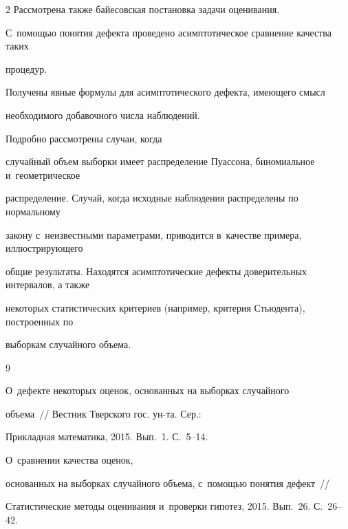 \begin{multicols}{2}
Рассмотрена также байесовская постановка задачи оценивания. 


С~по\-мощью понятия дефекта проведено асимптотическое сравнение качества таких 


процедур. 





Получены явные формулы для асимптотического дефекта, имеющего смысл


необходимого добавочного числа наблюдений. 





Подроб\-но рассмотрены случаи, когда 


случайный объем выборки имеет распределение Пуассона, биномиальное и~геометрическое 


распределение. Случай, когда исходные наблюдения распределены по нормальному 


закону с~неизвестными параметрами, приводится в~качестве примера, иллюстрирующего 


общие результаты. Находятся асимптотические дефекты доверительных интервалов, а также 


некоторых статистических критериев (например, критерия Стьюдента), построенных по 


выборкам случайного объема.





{\small\frenchspacing


 {%




 \begin{thebibliography}{9}




 О~дефекте некоторых оценок, основанных на выборках случайного


объема~// Вестник Тверского гос. ун-та. Сер.:


Прикладная математика, 2015. Вып.~1. С.~5--14.







 О~сравнении качества оценок, 


основанных на выборках случайного объема, с~помощью понятия дефект~//


Статистические методы оценивания и~проверки гипотез, 2015. Вып.~26. С.~26--42.






\end{thebibliography}}}
\end{multicols}

